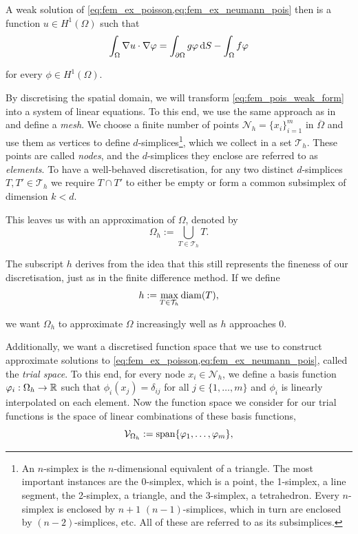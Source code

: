 \noindent
A weak solution of \cref{eq:fem_ex_poisson,eq:fem_ex_neumann_pois} then is a function $u \in H^1(\Omega)$ such that
%
\begin{equation}\label{eq:fem_pois_weak_form}
     \int_\Omega \nabla u \cdot \nabla \varphi = \int_{\partial \Omega} g \varphi \mathop{}\!\mathrm{d} S - \int_\Omega f \varphi
\end{equation}

\noindent
for every $\phi \in H^1(\Omega)$.

By discretising the spatial domain, we will transform \cref{eq:fem_pois_weak_form} into a system of linear equations. To this end, we use the same approach as in \cite{dziuk_elliott_2013} and define a \emph{mesh}. We choose a finite number of points $\mathcal{N}_h = \{ x_i \}_{i = 1}^{m}$ in $\overline{\Omega}$ and use them as vertices to define $d$-simplices\footnote{An $n$-simplex is the $n$-dimensional equivalent of a triangle. The most important instances are the 0-simplex, which is a point, the 1-simplex, a line segment, the 2-simplex, a triangle, and the 3-simplex, a tetrahedron. Every $n$-simplex is enclosed by $n + 1$ $(n-1)$-simplices, which in turn are enclosed by $(n-2)$-simplices, etc. All of these are referred to as its subsimplices.}, which we collect in a set $\mathcal{T}_h$. These points are called \emph{nodes}, and the $d$-simplices they enclose are referred to as \emph{elements}. To have a well-behaved discretisation, for any two distinct $d$-simplices $T, T' \in \mathcal{T}_h$ we require $T \cap T'$ to either be empty or form a common subsimplex of dimension $k < d$.

This leaves us with an approximation of $\Omega$, denoted by
%
\begin{equation*}
    \Omega_h := \bigcup_{T \in \mathcal{T}_h} T.
\end{equation*}

\noindent
The subscript $h$ derives from the idea that this still represents the fineness of our discretisation, just as in the finite difference method. If we define
%
\begin{equation*}
    h := \max_{T \in \mathcal{T}_h} \operatorname*{diam}(T),
\end{equation*}

\noindent
we want $\Omega_h$ to approximate $\Omega$ increasingly well as $h$ approaches $0$.

Additionally, we want a discretised function space that we use to construct approximate solutions to \cref{eq:fem_ex_poisson,eq:fem_ex_neumann_pois}, called the \emph{trial space}. To this end, for every node $x_i \in \mathcal{N}_h$, we define a basis function $\varphi_i: \Omega_h \to \mathbb{R}$ such that $\phi_i(x_j) = \delta_{ij}$ for all $j \in  \{ 1, \dots, m \}$ and $\phi_i$ is linearly interpolated on each element. Now the function space we consider for our trial functions is the space of linear combinations of these basis functions,
%
\begin{equation*}
    \mathcal{V}_{\Omega_h} := \operatorname*{span} \{ \varphi_1, \dots, \varphi_m \},
\end{equation*}

